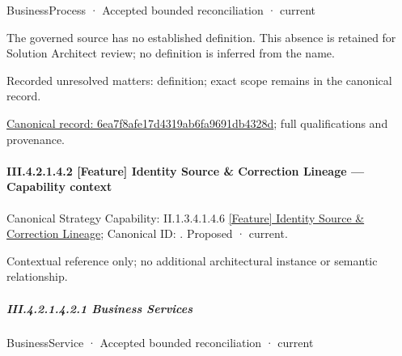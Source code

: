 \label{navigation:III.4.2.1.4.1.2.1}

\label{element:6ea7f8afe17d4319ab6fa9691db4328d}
{\small BusinessProcess · Accepted bounded reconciliation · current}\par

The governed source has no established definition. This absence is retained for Solution Architect review; no definition is inferred from the name.


{\small Recorded unresolved matters: definition; exact scope remains in the canonical record.}\par
{\footnotesize \href{../../../../continuum/business/business-process/6ea7f8afe17d4319ab6fa9691db4328d.md}{Canonical record: 6ea7f8afe17d4319ab6fa9691db4328d}; full qualifications and provenance.}\par
\paragraph*{III.4.2.1.4.2 [Feature] Identity Source \& Correction Lineage — Capability context}
\label{navigation:III.4.2.1.4.2}

{\small Canonical Strategy Capability: II.1.3.4.1.4.6 \hyperref[element:d72134e75001449a9e7ffae53f61458f]{[Feature] Identity Source \& Correction Lineage}; Canonical ID: \texttt{}. Proposed · current.}\par
Contextual reference only; no additional architectural instance or semantic relationship.\par
\subparagraph*{III.4.2.1.4.2.1 Business Services}
\label{navigation:III.4.2.1.4.2.1}

\label{navigation:III.4.2.1.4.2.1.1}

\label{element:b95f652107f4420b86cc10fb893c9b01}
{\small BusinessService · Accepted bounded reconciliation · current}\par

